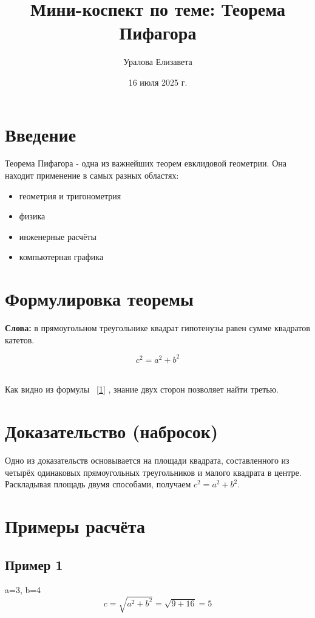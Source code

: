 \documentclass{article}
\title{Мини-коспект по теме: Теорема Пифагора}
\author{Уралова Елизавета}
\date{16 июля 2025 г.}
\begin{document}
\maketitle
\tableofcontents
\newpage
\section{Введение}

Теорема Пифагора - одна из важнейших теорем евклидовой геометрии. Она находит применение в самых разных областях: 
\\
\begin{itemize}
    \item геометрия и тригонометрия
    \item физика
    \item инженерные расчёты
    \item компьютерная графика
\end{itemize}
\section{Формулировка теоремы}

\textbf{Слова:}
в прямоугольном треугольнике квадрат гипотенузы равен сумме квадратов
катетов.
\\
\begin{center}
\begin{equation}
c^2 = a^2 + b^2
\label{1}
\end{equation}
\end{center}
\\
Как видно из формулы ~\ref{1}
, знание двух сторон позволяет найти третью.
\section{Доказательство (набросок)}
Одно из доказательств основывается на площади квадрата, составленного
из четырёх одинаковых прямоугольных треугольников и малого квадрата
в центре. Раскладывая площадь двумя способами, получаем $c^2 = a^2 + b^2$.

\section{Примеры расчёта}
\subsection*{Пример 1}
\begin{center}
    a=3, b=4
    \\
    \[
    c=\sqrt{a^2+b^2}=\sqrt{9+16}=5
    \]
\end{center}
\end{document}
